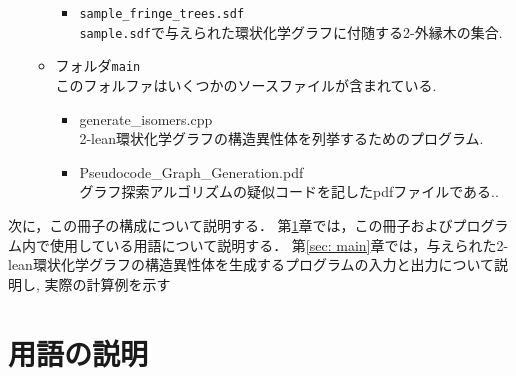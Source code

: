 \documentclass[11pt,titlepage,dvipdfmx,twoside]{jarticle}
\begin{document}
\begin{itemize}
\begin{itemize}
\begin{itemize}
			\item{\tt sample\_fringe\_trees.sdf}\\
      {\tt sample.sdf}で与えられた環状化学グラフに付随する2-外縁木の集合.
		\end{itemize}
	\item フォルダ{\tt main}\\
		このフォルファはいくつかのソースファイルが含まれている.
		\begin{itemize}
				
			\item{generate\_isomers.cpp}\\
      2-lean環状化学グラフの構造異性体を列挙するためのプログラム.
			
			\item{Pseudocode\_Graph\_Generation.pdf}\\
			  グラフ探索アルゴリズムの疑似コードを記したpdfファイルである..
		\end{itemize}

	\end{itemize}
\end{itemize}



次に，この冊子の構成について説明する．
第\ref{sec:term}章では，この冊子およびプログラム内で使用している用語について説明する．
第\ref{sec: main}章では，与えられた2-lean環状化学グラフの構造異性体を生成するプログラムの入力と出力について説明し, 実際の計算例を示す

\section{用語の説明}
\label{sec:term}
\end{document}
